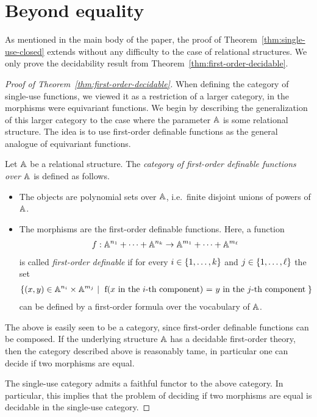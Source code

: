 \section{Beyond equality}
\label{sec:beyond-equality-appendix}

As mentioned in the main body of the paper, the proof of Theorem~\ref{thm:single-use-closed} extends without any difficulty to the case of relational structures. We only prove the decidability result from Theorem~\ref{thm:first-order-decidable}.


\begin{proof}[Proof of Theorem~\ref{thm:first-order-decidable}]
    When defining the category of single-use functions, we viewed it as a restriction of a larger category, in the morphisms were equivariant functions.  We begin by describing the generalization of this larger category to the case where the parameter $\mathbb A$ is some relational structure. The idea is to use first-order definable functions as the general analogue of equivariant functions. 

\begin{definition}
    Let $\mathbb A$ be a relational structure. The \emph{category of first-order definable functions over $\mathbb A$} is defined as follows.
    \begin{itemize}
        \item The objects are polynomial sets over $\mathbb A$, i.e.~finite disjoint unions of powers of $\mathbb A$.
        \item The morphisms are the  first-order definable functions. Here, a function 
        \begin{align*}
            f : \mathbb A^{n_1} + \cdots + \mathbb A^{n_k} \to \mathbb A^{m_1} + \cdots + \mathbb A^{m_\ell}
            \end{align*}
            is called  \emph{first-order definable} if for every $i \in \{1,\ldots,k\}$ and  $j \in \{1,\ldots,\ell\}$ the set 
            \begin{align*}
            \setbuild{ (x,y) \in \atoms^{n_i} \times \atoms^{m_j}}{f(\text{$x$ in the $i$-th component}) = \text{$y$ in the $j$-th component}}
            \end{align*}
            can be defined by a first-order formula over the vocabulary of $\mathbb A$.
    \end{itemize}
\end{definition}
The above is easily seen to be a category, since first-order definable functions  can be composed. 
If the underlying structure $\mathbb A$ has a decidable first-order theory, then the category described above is reasonably tame, in particular one can decide if two morphisms are equal.

The single-use category admits a faithful functor to the above category. In particular, this implies that the problem of deciding if two morphisms are equal is decidable in the single-use category. 
\end{proof}
